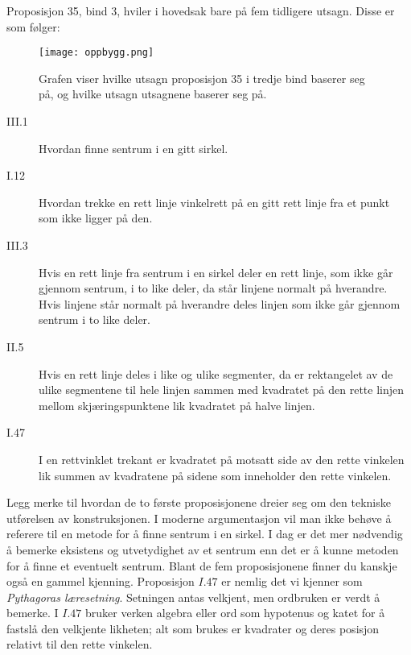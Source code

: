 \documentclass[norsk,twoside,utf8]{article}
\begin{document}
Proposisjon 35, bind 3, hviler i hovedsak bare på fem tidligere utsagn. Disse er som følger:
\begin{multicols}{2}

\begin{figure}[H]
\begin{center}
\texttt{[image: oppbygg.png]}
\end{center}
\caption{
Grafen viser hvilke utsagn proposisjon 35 i tredje bind baserer seg på, og hvilke utsagn utsagnene baserer seg på. 
}
\label{oppbygg}
\end{figure}

\begin{description}
\item[III.1] Hvordan finne sentrum i en gitt sirkel.
\item[I.12] Hvordan trekke en rett linje vinkelrett på en gitt rett linje fra et punkt som ikke ligger på den.
\item[III.3] Hvis en rett linje fra sentrum i en sirkel deler en rett linje, som ikke går gjennom sentrum, i to like deler, da står linjene normalt på hverandre. Hvis linjene står normalt på hverandre deles linjen som ikke går gjennom sentrum i to like deler. 
\item[II.5] Hvis en rett linje deles i like og ulike segmenter, da er rektangelet av de ulike segmentene til hele linjen sammen med kvadratet på den rette linjen mellom skjæringspunktene lik kvadratet på halve linjen. 
\item[I.47] I en rettvinklet trekant er kvadratet på motsatt side av den rette vinkelen lik summen av kvadratene på sidene som inneholder den rette vinkelen.
\end{description}

\end{multicols}

\noindent
Legg merke til hvordan de to første proposisjonene dreier seg om den tekniske utførelsen av konstruksjonen. I moderne argumentasjon vil man ikke behøve å referere til en metode for å finne sentrum i en sirkel. I dag er det mer nødvendig å bemerke eksistens og utvetydighet av et sentrum enn det er å kunne metoden for å finne et eventuelt sentrum. Blant de fem proposisjonene finner du kanskje også en gammel kjenning. Proposisjon $I.47$ er nemlig det vi kjenner som \textit{Pythagoras læresetning}. Setningen antas velkjent, men ordbruken er verdt å bemerke. I $I.47$ bruker verken algebra eller ord som hypotenus og katet for å fastslå den velkjente likheten; alt som brukes er kvadrater og deres posisjon relativt til den rette vinkelen. 
\end{document}
